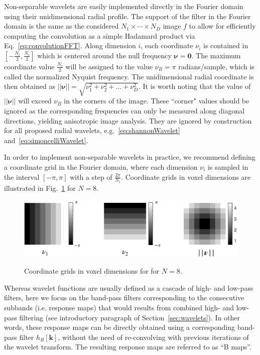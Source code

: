 \documentclass[fleqn,a4paper,oneside,openany]{book}
\begin{document}
Non-separable wavelets are easily implemented directly in the Fourier domain using their unidimensional radial profile.
The support of the filter in the Fourier domain is the same as the considered $N_1\times\cdots\times N_D$ image $f$ to allow for efficiently computing the convolution as a simple Hadamard product via Eq.~\eqref{eq:convolutionFFT}.
Along dimension $i$, each coordinate $\nu_i$ is contained in $[-\frac{N_i}{2},\frac{N_i}{2}]$ which is centered around the null frequency $\boldsymbol{\nu}=\boldsymbol{0}$.
The maximum coordinate value $\frac{N_i}{2}$ will be assigned to the value $\nu_{B}=\pi$ radians/sample, which is called the normalized Nyquist frequency.
The unidimensional radial coordinate is then obtained as $||\boldsymbol{\nu}||=\sqrt{\nu_1^2+\nu_2^2+\dots+\nu_D^2}$.
It is worth noting that the value of $||\boldsymbol{\nu}||$ will exceed $\nu_B$ in the corners of the image. These ``corner" values should be ignored as the corresponding frequencies can only be measured along diagonal directions, yielding anisotropic image analysis. They are ignored by construction for all proposed radial wavelets, e.g.~\eqref{eq:shannonWavelet} and~\eqref{eq:simoncelliWavelet}.


In order to implement non-separable wavelets in practice, we recommend defining a coordinate grid in the Fourier domain, where each dimension $\nu_i$ is sampled in the interval $[-\pi,\pi]$ with a step of $\frac{2\pi}{N_i}$.
Coordinate grids in voxel dimensions are illustrated in Fig.~\ref{fig:coordinateGridsFourier} for $N=8$.

%
\begin{figure}
\centering
\includegraphics[trim = 0 0 0 0, clip, width=.8\linewidth]{coordinateGridsFourier.png}\\
\caption{Coordinate grids in voxel dimensions for for $N=8$.}
  \label{fig:coordinateGridsFourier}
\end{figure}
%

Whereas wavelet functions are usually defined as a cascade of high- and low-pass filters, here we focus on the band-pass filters corresponding to the consecutive subbands (i.e. response maps) that would results from combined high- and low- pass filtering (see introductory paragraph of Section~\ref{sec:wavelets}). In other words, these response maps can be directly obtained using a corresponding band-pass filter $h_B[\boldsymbol{k}]$, without the need of re-convolving with previous iterations of the wavelet transform. The resulting response maps are referred to as ``B maps''.
\end{document}
